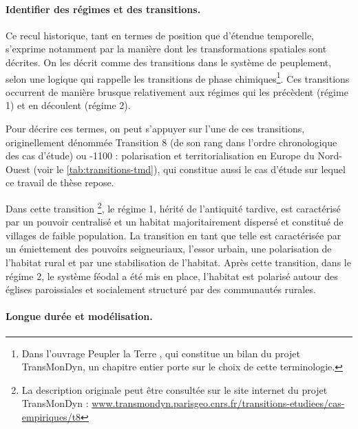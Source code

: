 \paragraph{Identifier des \og régimes\fg{} et des \og transitions\fg{}.}

Ce recul historique, tant en termes de position que d'étendue temporelle, s'exprime notamment par la manière dont les transformations spatiales sont décrites.
On les décrit comme des \og transitions\fg{} dans le système de peuplement, selon une logique qui rappelle les transitions de phase chimiques\footnote{
	Dans l'ouvrage \og Peupler la Terre\fg{} \autocite{sanders2018peupler}, qui constitue un bilan du projet TransMonDyn, un chapitre entier \autocite{pumain_convergences_2017} porte sur le choix de cette terminologie.
}.
Ces transitions occurrent de manière brusque relativement aux \og régimes\fg{} qui les précèdent (\og régime 1\fg{}) et en découlent (\og régime 2\fg{}).

Pour décrire ces termes, on peut s'appuyer sur l'une de ces transitions, originellement dénommée \og Transition 8\fg{} (de son rang dans l'ordre chronologique des cas d'étude) ou -1100 :
	polarisation et territorialisation en Europe du Nord-Ouest\fg{} (voir le \cref{tab:transitions-tmd}), qui constitue aussi le cas d'étude sur lequel ce travail de thèse repose.

Dans cette transition \footnote{
	La description originale peut être consultée sur le site internet du projet \mbox{TransMonDyn} : \href{http://www.transmondyn.parisgeo.cnrs.fr/transitions-etudiees/cas-empiriques/t8}{www.transmondyn.parisgeo.cnrs.fr/transitions-etudiees/cas-empiriques/t8}
}, le régime 1, hérité de l'antiquité tardive, est caractérisé par un pouvoir centralisé et un habitat majoritairement dispersé et constitué de villages de faible population.
La transition en tant que telle est caractérisée par un émiettement des pouvoirs seigneuriaux, l'essor urbain, une polarisation de l'habitat rural et par une stabilisation de l'habitat.
Après cette transition, dans le régime 2, le système féodal a été mis en place, l'habitat est polarisé autour des églises paroissiales et socialement structuré par des communautés rurales.

\paragraph{Longue durée et modélisation.}

